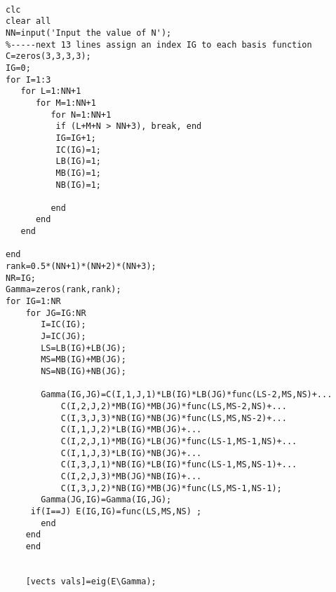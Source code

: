 \begin{lstlisting}

clc
clear all
NN=input('Input the value of N');
%-----next 13 lines assign an index IG to each basis function
C=zeros(3,3,3,3);
IG=0;
for I=1:3
   for L=1:NN+1
      for M=1:NN+1
         for N=1:NN+1 
          if (L+M+N > NN+3), break, end
          IG=IG+1;
          IC(IG)=1;
          LB(IG)=1;
          MB(IG)=1;
          NB(IG)=1;
             
         end
      end
   end
    
end
rank=0.5*(NN+1)*(NN+2)*(NN+3);
NR=IG;
Gamma=zeros(rank,rank);
for IG=1:NR
    for JG=IG:NR
       I=IC(IG);
       J=IC(JG);
       LS=LB(IG)+LB(JG);
       MS=MB(IG)+MB(JG);
       NS=NB(IG)+NB(JG);
       
       Gamma(IG,JG)=C(I,1,J,1)*LB(IG)*LB(JG)*func(LS-2,MS,NS)+...
           C(I,2,J,2)*MB(IG)*MB(JG)*func(LS,MS-2,NS)+...
           C(I,3,J,3)*NB(IG)*NB(JG)*func(LS,MS,NS-2)+...
           C(I,1,J,2)*LB(IG)*MB(JG)+...
           C(I,2,J,1)*MB(IG)*LB(JG)*func(LS-1,MS-1,NS)+... 
           C(I,1,J,3)*LB(IG)*NB(JG)+...
           C(I,3,J,1)*NB(IG)*LB(IG)*func(LS-1,MS,NS-1)+...
           C(I,2,J,3)*MB(JG)*NB(IG)+...
           C(I,3,J,2)*NB(IG)*MB(JG)*func(LS,MS-1,NS-1);
       Gamma(JG,IG)=Gamma(IG,JG);
     if(I==J) E(IG,IG)=func(LS,MS,NS) ; 
       end  
    end   
    end

    
    [vects vals]=eig(E\Gamma);
    
    
    
    



\end{lstlisting}
